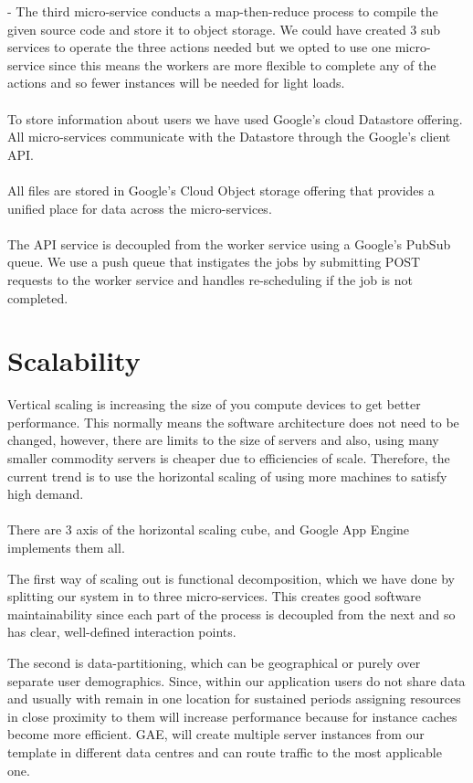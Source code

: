 \documentclass[conference]{IEEEtran}
\begin{document}
- The third micro-service conducts a map-then-reduce process to compile the given source code and store it to object storage. We could have created 3 sub services to operate the three actions needed but we opted to use one micro-service since this means the workers are more flexible to complete any of the actions and so fewer instances will be needed for light loads.
\\\\
To store information about users we have used Google's cloud Datastore offering. All micro-services communicate with the Datastore through the Google's client API.
\\\\
All files are stored in Google's Cloud Object storage offering that provides a unified place for data across the micro-services.
\\\\
The API service is decoupled from the worker service using a Google's PubSub queue. We use a push queue that instigates the jobs by submitting POST requests to the worker service and handles re-scheduling if the  job is not completed.

\section{Scalability}

Vertical scaling is increasing the size of you compute devices to get better performance. This normally means the software architecture does not need to be changed, however, there are limits to the size of servers and also, using many smaller commodity servers is cheaper due to efficiencies of scale. Therefore, the current trend is to use the horizontal scaling of using more machines to satisfy high demand.
\\\\
There are 3 axis of the horizontal scaling cube, and Google App Engine implements them all.

The first way of scaling out is functional decomposition, which we have done by splitting our system in to three micro-services. This creates good software maintainability since each part of the process is decoupled from the next and so has clear, well-defined interaction points.

The second is data-partitioning, which can be geographical or purely over separate user demographics. Since, within our application users do not share data and usually with remain in one location for sustained periods assigning resources in close proximity to them will increase performance because for instance caches become more efficient. GAE, will create multiple server instances from our template in different data centres and can route traffic to the most applicable one. 
\end{document}
